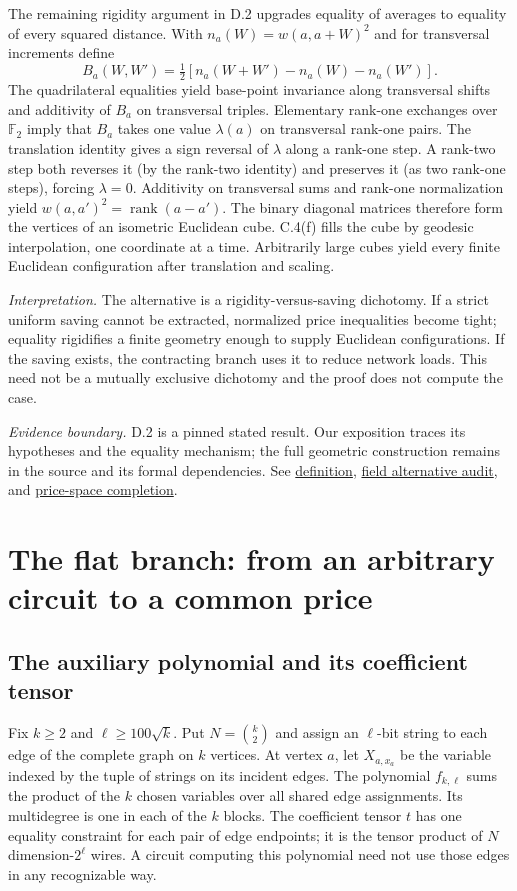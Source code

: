 \documentclass[11pt,letterpaper]{article}
\theoremstyle{definition}\newtheorem{definition}[theorem]{Definition}\newtheorem{example}[theorem]{Example}
\theoremstyle{remark}\newtheorem{remark}[theorem]{Remark}
\newcommand{\F}{\mathbb{F}}
\newcommand{\pub}[3]{\href{https://github.com/anthropics/formal-math/blob/11b6c7e3c927df2658f513b6b68ea7f8929c62c5/vp-vnp/#1\#L#2}{#3}}
\newcommand{\aud}[2]{\href{https://github.com/nousentllc/VP-VNP-Review/blob/567303d0bcf4f9d54390437b137752446e58ccd6/#1}{#2}}
\newcommand{\scope}[1]{\par\smallskip\noindent\textit{Evidence boundary.} #1\par\smallskip}
\newcommand{\interpret}[1]{\par\smallskip\noindent\textit{Interpretation.} #1\par\smallskip}
\begin{document}
The remaining rigidity argument in D.2 upgrades equality of averages to equality of every squared distance. With $n_a(W)=w(a,a+W)^2$ and for transversal increments define
\[
 B_a(W,W')=\tfrac12[n_a(W+W')-n_a(W)-n_a(W')].
\]
The quadrilateral equalities yield base-point invariance along transversal shifts and additivity of $B_a$ on transversal triples. Elementary rank-one exchanges over $\F_2$ imply that $B_a$ takes one value $\lambda(a)$ on transversal rank-one pairs. The translation identity gives a sign reversal of $\lambda$ along a rank-one step. A rank-two step both reverses it (by the rank-two identity) and preserves it (as two rank-one steps), forcing $\lambda=0$. Additivity on transversal sums and rank-one normalization yield $w(a,a')^2=\operatorname{rank}(a-a')$. The binary diagonal matrices therefore form the vertices of an isometric Euclidean cube. C.4(f) fills the cube by geodesic interpolation, one coordinate at a time. Arbitrarily large cubes yield every finite Euclidean configuration after translation and scaling.

\interpret{The alternative is a rigidity-versus-saving dichotomy. If a strict uniform saving cannot be extracted, normalized price inequalities become tight; equality rigidifies a finite geometry enough to supply Euclidean configurations. If the saving exists, the contracting branch uses it to reduce network loads. This need not be a mutually exclusive dichotomy and the proof does not compute the case.}
\scope{D.2 is a pinned stated result. Our exposition traces its hypotheses and the equality mechanism; the full geometric construction remains in the source and its formal dependencies. See \pub{Paper/Alternative.lean}{43}{definition}, \aud{passes/07-field-alternative.md}{field alternative audit}, and \aud{passes/08-price-space-completion.md}{price-space completion}.}

\section{The flat branch: from an arbitrary circuit to a common price}\label{sec:flat}
\subsection{The auxiliary polynomial and its coefficient tensor}
Fix $k\ge2$ and $\ell\ge100\sqrt{k}$. Put $N=\binom{k}{2}$ and assign an $\ell$-bit string to each edge of the complete graph on $k$ vertices. At vertex $a$, let $X_{a,x_a}$ be the variable indexed by the tuple of strings on its incident edges. The polynomial $f_{k,\ell}$ sums the product of the $k$ chosen variables over all shared edge assignments. Its multidegree is one in each of the $k$ blocks. The coefficient tensor $t$ has one equality constraint for each pair of edge endpoints; it is the tensor product of $N$ dimension-$2^\ell$ wires. A circuit computing this polynomial need not use those edges in any recognizable way.
\end{document}
